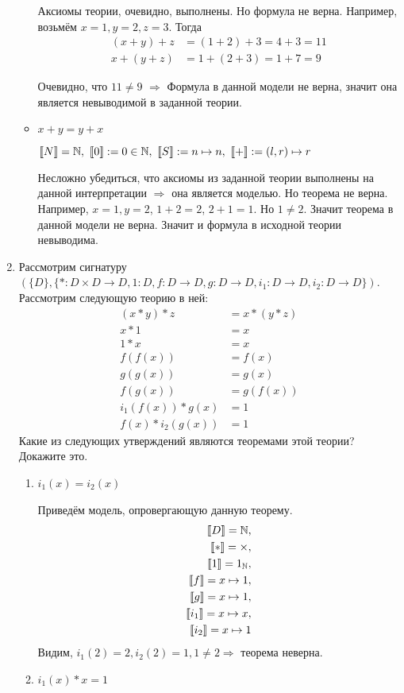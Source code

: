\begin{enumerate}
\begin{itemize}
Аксиомы теории, очевидно, выполнены. Но формула не верна. Например, возьмём $x = 1, y = 2, z = 3$. Тогда
\begin{align*}
(x + y) + z &= (1 + 2) + 3 = 4 + 3 = 11 \\
x + (y + z) &= 1 + (2 + 3) = 1 + 7 = 9
\end{align*} 

Очевидно, что $11 \neq 9$ $\Rightarrow$ Формула в данной модели не верна, значит она является невыводимой в заданной теории.

\item $x + y = y + x$

$\llb N \rrb = \mathbb{N}, \
\llb 0 \rrb := 0 \in \mathbb{N},\
\llb S \rrb := n \mapsto n, \ 
\llb + \rrb := (l, r) \mapsto r$

Несложно убедиться, что аксиомы из заданной теории выполнены на данной интерпретации $\Rightarrow$ она является 
моделью. Но теорема не верна. Например, $x = 1, y = 2$, $1 + 2 = 2$, $2 + 1 = 1$. Но $1 \neq 2$. Значит теорема в 
данной модели не верна. Значит и формула в исходной теории невыводима.

\end{itemize}

\item Рассмотрим сигнатуру $(\{D\}, \{ * : D \times D \to D, 1 : D, f : D \to D, g : D \to D, i_1 : D \to D, i_2 : D \to D \})$.
    Рассмотрим следующую теорию в ней:
\begin{align*}
(x * y) * z & = x * (y * z) \\
x * 1 & = x \\
1 * x & = x \\
f(f(x)) & = f(x) \\
g(g(x)) & = g(x) \\
f(g(x)) & = g(f(x)) \\
i_1(f(x)) * g(x) & = 1 \\
f(x) * i_2(g(x)) & = 1
\end{align*}
Какие из следующих утверждений являются теоремами этой теории? Докажите это.
\begin{enumerate}
\item $i_1(x) = i_2(x)$\

Приведём модель, опровергающую данную теорему. 
\begin{align*}
\llbracket D \rrbracket = \mathbb{N}, \\
\llbracket * \rrbracket = \times, \\
\llbracket 1 \rrbracket = 1_{\mathbb{N}}, \\
\llbracket f \rrbracket = x \mapsto 1, \\
\llbracket g \rrbracket = x \mapsto 1, \\
\llbracket i_1 \rrbracket = x \mapsto x, \\
\llbracket i_2 \rrbracket = x \mapsto 1
\end{align*}
Видим, $i_1(2) = 2, i_2(2) = 1, 1 \neq 2 \Rightarrow$ теорема неверна.
\item $i_1(x) * x = 1$


\end{enumerate}
\end{enumerate}
